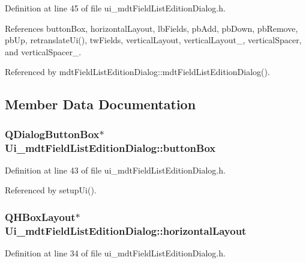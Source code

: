 Definition at line 45 of file ui\-\_\-mdt\-Field\-List\-Edition\-Dialog.\-h.



References button\-Box, horizontal\-Layout, lb\-Fields, pb\-Add, pb\-Down, pb\-Remove, pb\-Up, retranslate\-Ui(), tw\-Fields, vertical\-Layout, vertical\-Layout\-\_, vertical\-Spacer, and vertical\-Spacer\-\_.



Referenced by mdt\-Field\-List\-Edition\-Dialog\-::mdt\-Field\-List\-Edition\-Dialog().



\subsection{Member Data Documentation}
\hypertarget{class_ui__mdt_field_list_edition_dialog_a074a314fc3539819957aac83591d0ae3}{
\subsubsection[{button\-Box}]{\setlength{\rightskip}{0pt plus 5cm}Q\-Dialog\-Button\-Box$\ast$ Ui\-\_\-mdt\-Field\-List\-Edition\-Dialog\-::button\-Box}}\label{class_ui__mdt_field_list_edition_dialog_a074a314fc3539819957aac83591d0ae3}


Definition at line 43 of file ui\-\_\-mdt\-Field\-List\-Edition\-Dialog.\-h.



Referenced by setup\-Ui().

\hypertarget{class_ui__mdt_field_list_edition_dialog_a1803b58ae2f7ca22757db159d0c1c580}{
\subsubsection[{horizontal\-Layout}]{\setlength{\rightskip}{0pt plus 5cm}Q\-H\-Box\-Layout$\ast$ Ui\-\_\-mdt\-Field\-List\-Edition\-Dialog\-::horizontal\-Layout}}\label{class_ui__mdt_field_list_edition_dialog_a1803b58ae2f7ca22757db159d0c1c580}


Definition at line 34 of file ui\-\_\-mdt\-Field\-List\-Edition\-Dialog.\-h.



